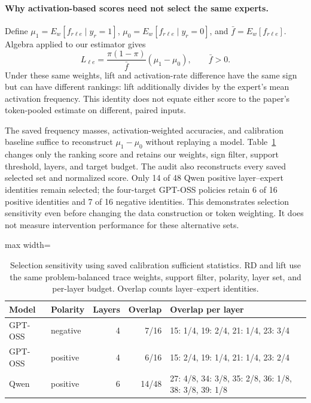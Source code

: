 \documentclass[12pt,a4paper,twoside,openright]{book}
\begin{document}
\paragraph{Why activation-based scores need not select the same experts.}
Define $\mu_1=E_w[f_{r\ell e}\mid y_r=1]$,
$\mu_0=E_w[f_{r\ell e}\mid y_r=0]$, and
$\bar f=E_w[f_{r\ell e}]$. Algebra applied to our estimator gives
\begin{equation}
L_{\ell e}=\frac{\pi(1-\pi)}{\bar f}(\mu_1-\mu_0),\qquad \bar f>0.
\end{equation}
Under these same weights, lift and activation-rate difference have the same
sign but can have different rankings: lift additionally divides by the
expert's mean activation frequency. This identity does not equate either
score to the paper's token-pooled estimate on different, paired inputs.

The saved frequency masses, activation-weighted accuracies, and calibration
baseline suffice to reconstruct $\mu_1-\mu_0$ without replaying a model.
Table~\ref{tab:selection-audit} changes only the ranking score and retains
our weights, sign filter, support threshold, layers, and target budget.
The audit also reconstructs every saved selected set and normalized score.
Only 14 of 48 Qwen positive layer--expert identities remain selected;
the four-target GPT-OSS policies retain 6 of 16 positive identities and
7 of 16 negative identities.
This demonstrates selection sensitivity even before changing the data
construction or token weighting. It does not measure intervention performance
for these alternative sets.

\begin{table}[!ht]\centering\small
\caption{Selection sensitivity using saved calibration sufficient statistics. RD and lift use the same problem-balanced trace weights, support filter, polarity, layer set, and per-layer budget. Overlap counts layer--expert identities.}
\label{tab:selection-audit}
\begin{adjustbox}{max width=\linewidth}%
\begin{tabular}{llrrl}\toprule
Model & Polarity & Layers & Overlap & Overlap per layer \\\midrule
GPT-OSS & negative & 4 & 7/16 & 15: 1/4, 19: 2/4, 21: 1/4, 23: 3/4 \\
GPT-OSS & positive & 4 & 6/16 & 15: 2/4, 19: 1/4, 21: 1/4, 23: 2/4 \\
Qwen & positive & 6 & 14/48 & 27: 4/8, 34: 3/8, 35: 2/8, 36: 1/8, 38: 3/8, 39: 1/8 \\
\bottomrule\end{tabular}
\end{adjustbox}\end{table}
\end{document}
